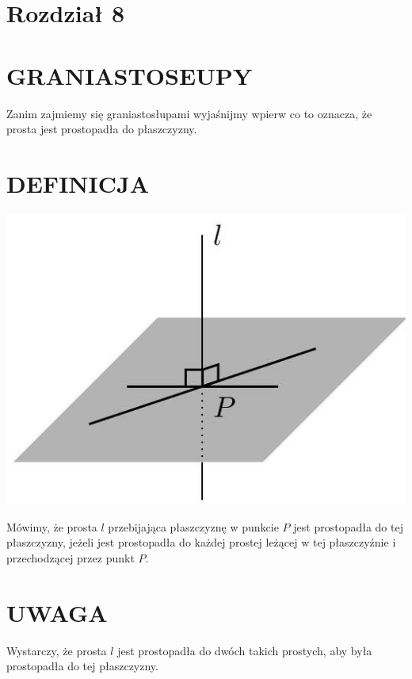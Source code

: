 \documentclass[10pt]{article}
\begin{document}
\section*{Rozdział 8}
\section*{GRANIASTOSEUPY}
Zanim zajmiemy się graniastosłupami wyjaśnijmy wpierw co to oznacza, że prosta jest prostopadła do płaszczyzny.

\section*{DEFINICJA}
\begin{center}
\includegraphics[max width=\textwidth]{2024_11_21_e9b4faa005d5be2cc318g-076}
\end{center}

Mówimy, że prosta \(l\) przebijająca płaszczyznę w punkcie \(P\) jest prostopadła do tej płaszczyzny, jeżeli jest prostopadła do każdej prostej leżącej w tej płaszczyźnie i przechodzącej przez punkt \(P\).

\section*{UWAGA}
Wystarczy, że prosta \(l\) jest prostopadła do dwóch takich prostych, aby była prostopadła do tej płaszczyzny.
\end{document}
